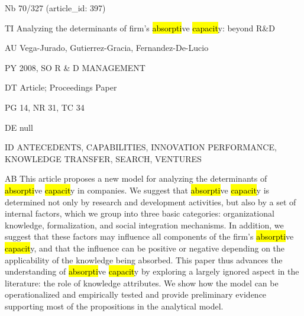 \documentclass[a4paper]{article}
\begin{document}
\vspace*{-2cm}
Nb \tabto{0cm}70/327 (article\_id: 397)\par
TI \tabto{0cm}Analyzing the determinants of firm's \hl{absorpti}ve \hl{capacit}y: beyond R\&D\par
AU \tabto{0cm}Vega-Jurado, Gutierrez-Gracia, Fernandez-De-Lucio\par
PY \tabto{0cm}2008, SO R \& D MANAGEMENT\par
DT \tabto{0cm}Article; Proceedings Paper\par
PG \tabto{0cm}14, NR 31, TC 34\par
DE \tabto{0cm}null\par
ID \tabto{0cm}ANTECEDENTS, CAPABILITIES, INNOVATION PERFORMANCE, KNOWLEDGE TRANSFER, SEARCH, VENTURES\par
AB \tabto{0cm}This article proposes a new model for analyzing the determinants of \hl{absorpti}ve \hl{capacit}y in companies. We suggest that \hl{absorpti}ve \hl{capacit}y is determined not only by research and development activities, but also by a set of internal factors, which we group into three basic categories: organizational knowledge, formalization, and social integration mechanisms. In addition, we suggest that these factors may influence all components of the firm's \hl{absorpti}ve \hl{capacit}y, and that the influence can be positive or negative depending on the applicability of the knowledge being absorbed. This paper thus advances the understanding of \hl{absorpti}ve \hl{capacit}y by exploring a largely ignored aspect in the literature: the role of knowledge attributes. We show how the model can be operationalized and empirically tested and provide preliminary evidence supporting most of the propositions in the analytical model.\par
\clearpage
\end{document}
